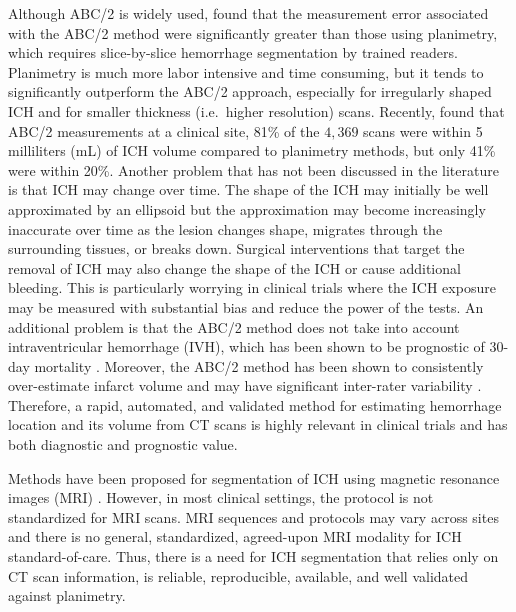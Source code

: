 \documentclass{elsarticle_nonatbib}\usepackage[]{graphicx}\usepackage[]{color}
\begin{document}
Although ABC/2 is widely used, \citet{divani_abcs_2011} found that the measurement error associated with the ABC/2 method were significantly greater than those using planimetry, which requires slice-by-slice hemorrhage segmentation by trained readers. Planimetry is much more labor intensive and time consuming, but it tends to significantly outperform the ABC/2 approach, especially for irregularly shaped ICH and for smaller thickness (i.e.~higher resolution) scans.  Recently, \citet{webb_accuracy_2015} found that ABC/2 measurements at a clinical site, 81\% of the $4,369$ scans were within 5 milliliters (mL) of ICH volume compared to planimetry methods, but only 41\% were within 20\%.   Another problem that has not been discussed in the literature is that ICH may change over time. The shape of the ICH may initially be well approximated by an ellipsoid but the approximation may become increasingly inaccurate over time as the lesion changes shape, migrates through the surrounding tissues, or breaks down.  Surgical interventions that target the removal of ICH may also change the shape of the ICH or cause additional bleeding. This is particularly worrying in clinical trials where the ICH exposure may be measured with substantial bias and reduce the power of the tests.  An additional problem is that the ABC/2 method does not take into account intraventricular hemorrhage (IVH), which has been shown to be prognostic of 30-day mortality \citep{hemphill_ich_2001, tuhrim_volume_1999}.  Moreover, the ABC/2 method has been shown to consistently over-estimate infarct volume \citep{pedraza_reliability_2012} and may have significant inter-rater variability \citep{hussein_reliability_2013}. Therefore, a rapid, automated, and validated method for estimating hemorrhage location and its volume from CT scans is highly relevant in clinical trials and has both diagnostic and prognostic value.

Methods have been proposed for segmentation of ICH using magnetic resonance images (MRI) \citep{wang_hematoma_2013, carhuapoma2003brain}.  However, in most clinical settings,
the protocol is not standardized for MRI scans.  MRI sequences and protocols may vary across sites and there is no general, standardized, agreed-upon MRI modality for ICH standard-of-care.
Thus, there is a need for ICH segmentation that relies only on CT scan information, is reliable, reproducible, available, and well validated against planimetry.
\end{document}
